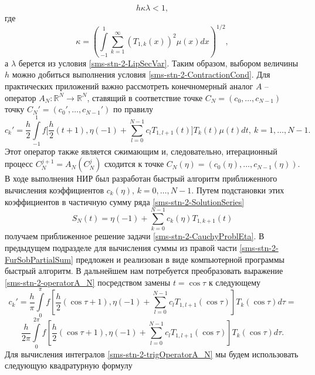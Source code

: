 \begin{equation}\label{sms-stn-2-ContractionCond}
h\kappa\lambda<1,
\end{equation}
где
\begin{equation*}
\kappa=\left(\int\limits_{-1}^1\sum_{k=1}^{\infty}(T_{1,k}(x))^2\mu(x)dx\right)^{1/2},
\end{equation*}
а $\lambda$ берется из условия \eqref{sms-stn-2-LipSecVar}. Таким образом, выбором величины $h$ можно добиться выполнения условия \eqref{sms-stn-2-ContractionCond}.
Для практических приложений важно рассмотреть конечномерный аналог $A$ -- оператор $A_N : \mathbb{R}^N\rightarrow\mathbb{R}^N$, ставящий в соответствие точке $C_N = (c_0,\ldots,c_{N-1})$ точку $C_N' = (c_0',\ldots,c_{N-1}')$ по правилу
\begin{equation}\label{sms-stn-2-operatorA_N}
c_k'=\frac h2\int\limits_{-1}^1f\bigl[\frac h2(t+1),\eta(-1)+\sum\limits_{l=0}^{N-1}c_l T_{1,l+1}(t)\bigr]T_k(t)\mu(t)dt,\ k=1,\ldots,N-1.
\end{equation}
Этот оператор также является сжимающим \cite{sms-stn-2-PolOrtPorSobChebUrav} и, следовательно, итерационный процесс $C_N^{j+1}=A_N(C_N^j)$ сходится к точке $C_N(\eta)=(c_0(\eta),\dots,c_{N-1}(\eta))$. В ходе выполнения НИР был разработан быстрый алгоритм приближенного вычисления коэффициентов $c_k(\eta)$, $k=0,\ldots,N-1$. Путем подстановки этих коэффициентов в частичную сумму ряда \eqref{sms-stn-2-SolutionSeries}
\begin{equation}\label{sms-stn-2-FurSobPartialSum}
S_{N}(t)=\eta(-1)+\sum\limits_{k=0}^{N-1}c_k(\eta) T_{1,k+1}(t)
\end{equation}
получаем приближенное решение задачи \eqref{sms-stn-2-CauchyProblEta}. В предыдущем подразделе для вычисления суммы из правой части \eqref{sms-stn-2-FurSobPartialSum} предложен и реализован в виде компьютерной программы быстрый алгоритм. В  дальнейшем нам потребуется преобразовать выражение \eqref{sms-stn-2-operatorA_N} посредством замены $t=\cos\tau$ к следующему
\begin{equation*}
c_k'=  \frac h\pi\int\limits_0^{\pi}f\left[\frac h2(\cos\tau+1),\eta(-1)+\sum\limits_{l=0}^{N-1}c_l T_{1,l+1}(\cos\tau)\right]T_k(\cos\tau)d\tau=
\end{equation*}
\begin{equation}\label{sms-stn-2-trigOperatorA_N}
\frac h{2\pi}\int\limits_0^{2\pi}f\left[\frac h2(\cos\tau+1),\eta(-1)+\sum\limits_{l=0}^{N-1}c_l T_{1,l+1}(\cos\tau)\right]T_k(\cos\tau)d\tau.
\end{equation}
Для вычисления интегралов \eqref{sms-stn-2-trigOperatorA_N} мы будем использовать следующую квадратурную формулу
